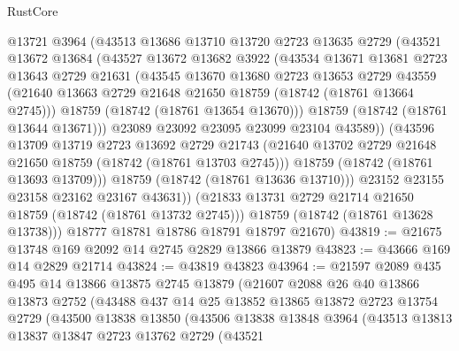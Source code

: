 \begin{lexlean}{RustCore}
\begin{coremodule}
            @13721
            @3964
            (@43513
              @13686
              @13710
              @13720
              @2723
              @13635
              @2729
              (@43521
                @13672
                @13684
                (@43527
                  @13672
                  @13682
                  @3922
                  (@43534
                    @13671
                    @13681
                    @2723
                    @13643
                    @2729
                    @21631
                    (@43545
                      @13670
                      @13680
                      @2723
                      @13653
                      @2729
                      @43559
                      (@21640 @13663 @2729 @21648 @21650 @18759 (@18742 (@18761 @13664 @2745)))
                      @18759
                      (@18742 (@18761 @13654 @13670)))
                    @18759
                    (@18742 (@18761 @13644 @13671)))
                  @23089
                  @23092
                  @23095
                  @23099
                  @23104
                  @43589))
              (@43596
                @13709
                @13719
                @2723
                @13692
                @2729
                @21743
                (@21640 @13702 @2729 @21648 @21650 @18759 (@18742 (@18761 @13703 @2745)))
                @18759
                (@18742 (@18761 @13693 @13709)))
              @18759
              (@18742 (@18761 @13636 @13710)))
            @23152
            @23155
            @23158
            @23162
            @23167
            @43631))
        (@21833 @13731 @2729 @21714 @21650 @18759 (@18742 (@18761 @13732 @2745)))
        @18759
        (@18742 (@18761 @13628 @13738)))
      @18777
      @18781
      @18786
      @18791
      @18797
      @21670)
@43819 := @21675 @13748 @169 @2092 @14 @2745 @2829 @13866 @13879
@43823 := @43666 @169 @14 @2829 @21714
@43824 := @43819 @43823
@43964 := @21597
    @2089
    @435
    @495
    @14
    @13866
    @13875
    @2745
    @13879
    (@21607
      @2088
      @26
      @40
      @13866
      @13873
      @2752
      (@43488
        @437
        @14
        @25
        @13852
        @13865
        @13872
        @2723
        @13754
        @2729
        (@43500
          @13838
          @13850
          (@43506
            @13838
            @13848
            @3964
            (@43513
              @13813
              @13837
              @13847
              @2723
              @13762
              @2729
              (@43521

\end{coremodule}
\end{lexlean}

